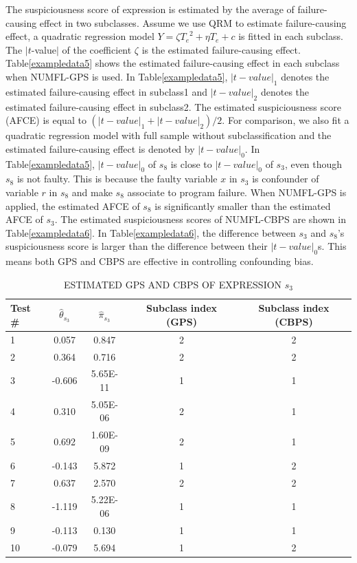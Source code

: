 \documentclass[times]{stvrauth}
\begin{document}
The suspiciousness score of expression is estimated by the average of failure-causing effect in two subclasses. Assume we use QRM to estimate failure-causing effect,  a quadratic regression model $Y = \zeta {T_e}^2 + \eta {T_e} + c$  is fitted in each subclass. The $|t$-value$|$ of  the coefficient $\zeta$ is the estimated failure-causing effect. Table\ref{exampledata5} shows the estimated failure-causing effect in each subclass when NUMFL-GPS is used.  In Table\ref{exampledata5},  ${|t-value|}_1$ denotes the estimated failure-causing effect in subclass1 and ${|t-value|}_2$ denotes the estimated failure-causing effect in subclass2. The estimated suspiciousness score (AFCE) is equal to  $({{|t-value|}_1}+{{|t-value|}_2})/2$. For comparison, we also fit a quadratic regression model with full sample without subclassification and the estimated failure-causing effect is denoted by ${|t-value|}_0$. In Table\ref{exampledata5}, ${|t-value|}_0$ of $s_8$ is close to ${|t-value|}_0$ of $s_3$, even though $s_8$ is not faulty. This is because the faulty variable $x$ in $s_3$ is confounder of variable $r$ in  $s_8$ and make $s_8$ associate to program failure. When NUMFL-GPS is applied, the estimated AFCE of $s_8$ is significantly smaller than the estimated AFCE of $s_3$. The estimated suspiciousness scores of NUMFL-CBPS are shown in  Table\ref{exampledata6}. In Table\ref{exampledata6}, the difference between  $s_3$ and $s_8$'s suspiciousness score is larger than the difference between their ${|t-value|}_0$s. This means both GPS and CBPS are effective in controlling confounding bias.  


\begin{table}[htbp!]
\caption{ESTIMATED GPS AND CBPS OF EXPRESSION $s_3$}
\label{exampledata3}
\centering
      \begin{tabular}{|l|c|c|c|c|}
      \hline
Test \#	&	${\hat{\theta}}_{s_3}$	&	${\hat{\pi}}_{s_3}$	&	Subclass index (GPS)	&	Subclass index (CBPS)	\\ \hline
1	&	0.057	&	0.847	&	2	&	2	\\ \hline
2	&	0.364	&	0.716	&	2	&	2	\\ \hline
3	&	-0.606	&	5.65E-11	&	1	&	1	\\ \hline
4	&	0.310	&	5.05E-06	&	2	&	1	\\ \hline
5	&	0.692	&	1.60E-09	&	2	&	1	\\ \hline
6	&	-0.143	&	5.872	&	1	&	2	\\ \hline
7	&	0.637	&	2.570	&	2	&	2	\\ \hline
8	&	-1.119	&	5.22E-06	&	1	&	1	\\ \hline
9	&	-0.113	&	0.130	&	1	&	1	\\ \hline
10	&	-0.079	&	5.694	&	1	&	2	\\ \hline
\end{tabular}
\end{table}
\end{document}
